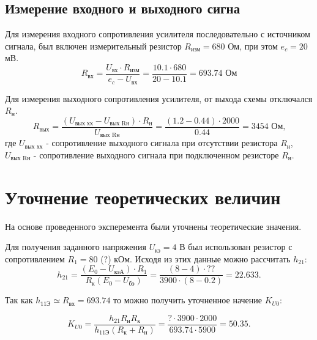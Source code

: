\subsection{Измерение входного и выходного сигна}

Для измерения входного сопротивления усилителя последовательно с источником сигнала, был включен измерительный резистор $R_\text{изм} = 680$ Ом, при этом $e_c = 20$ мВ.
\begin{equation}
R_\text{вх} = \frac{U_\text{вх} \cdot R_\text{изм}}{e_c - U_\text{вх}} = \frac{10.1 \cdot 680}{20 - 10.1} = 693.74 \text{ Ом}
\end{equation}


Для измерения выходного сопротивления усилителя, от выхода схемы отключался $R_\text{н}$.
\begin{equation}
R_\text{вых} = \frac{(U_\text{вых хх} - U_\text{вых Rн}) \cdot R_\text{н}}{U_\text{вых Rн}} = \frac{(1.2 - 0.44) \cdot 2000}{0.44} = 3454 \text{ Ом,}
\end{equation}
где $U_\text{вых хх}$ - сопротивление выходного сигнала при отсутствии резистора $R_\text{н}$, $U_\text{вых Rн}$ - сопротивление выходного сигнала при подключенном резисторе $R_\text{н}$.

\section{Уточнение теоретических величин}

На основе проведенного эксперемента были уточнены теоретические значения.

Для получения заданного напряжения $U_\text{кэ} = 4$ В был использован резистор с сопротивлением $R_1 = 80$ (?) кОм. Исходя из этих данные можно рассчитать $h_{21}$:
\begin{equation}
h_{21} = \frac{(E_0 - U_\text{кэА}) \cdot R_1}{R_\text{к}(E_0 - U_\text{бэ})} = \frac{(8 - 4) \cdot ??}{3900 \cdot (8 - 0.2)} = 22.633.
\end{equation}

Так как $h_{11\text{Э}} \simeq R_{\text{вх}} = 693.74$ то можно получить уточненное начение $K_{U0}$: 

\begin{equation*}
K_{U0} = \frac{h_{21}R_\text{н}R_\text{к}}{h_\text{11Э}(R_\text{к}+R_\text{н})} = \frac{? \cdot 3900 \cdot 2000}{693.74 \cdot 5900} = 50.35.
\end{equation*}

